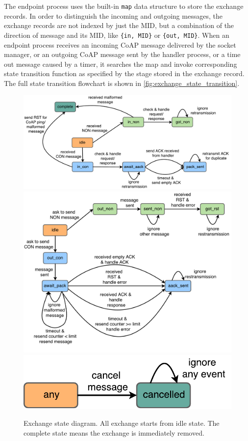 The endpoint process uses the built-in \verb|map| data structure to store the exchange records. In order to distinguish the incoming and outgoing messages, the exchange records are not indexed by just the MID, but a combination of the direction of message and its MID, like \verb|{in, MID}| or \verb|{out, MID}|. When an endpoint process receives an incoming CoAP message delivered by the socket manager, or an outgoing CoAP message sent by the handler process, or a time out message caused by a timer, it searches the map and invoke corresponding state transition function as specified by the stage stored in the exchange record. The full state transition flowchart is shown in \autoref{fig:exchange_state_transition}.

\begin{figure}[!htbp]
\centering
\includegraphics[scale = 0.55]{exchange_state_in}
\includegraphics[scale = 0.55]{exchange_state_out}
\includegraphics[scale = 0.55]{exchange_state_cancel}
\caption[Exchange state diagram]{Exchange state diagram. All exchange starts from idle state. The complete state means the exchange is immediately removed.}
\label{fig:exchange_state_transition}
\end{figure}


